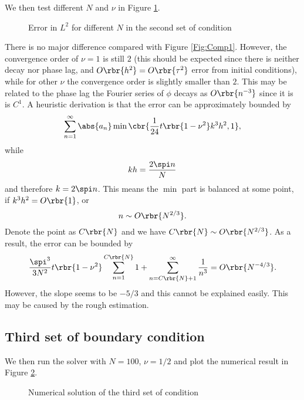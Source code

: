\documentclass[english, nochinese]{pnote}
\begin{document}
We then test different $N$ and $\nu$ in Figure \ref{Fig:Comp2}.

\begin{figure}[htbp]
\centering
\scalebox{0.7}{}
\caption{Error in $L^2$ for different $N$ in the second set of condition}
\label{Fig:Comp2}
\end{figure}

There is no major difference compared with Figure \ref{Fig:Comp1}. However, the convergence order of $ \nu = 1 $ is still $2$ (this should be expected since there is neither decay nor phase lag, and $ O \rbr{h^2} = O \rbr{\tau^2} $ error from initial conditions), while for other $\nu$ the convergence order is slightly smaller than $2$. This may be related to the phase lag the Fourier series of $\phi$ decays as $ O \rbr{n^{-3}} $ since it is is $C^1$. A heuristic derivation is that the error can be approximately bounded by
\begin{equation}
\sum_{ n = 1 }^{\infty} \abs{a_n} \min \cbr{ \frac{1}{24} t \rbr{ 1 - \nu^2 } k^3 h^2, 1 },
\end{equation}
while
\begin{equation}
k h = \frac{ 2 \spi n }{N}
\end{equation}
and therefore $ k = 2 \spi n $. This means the $\min$ part is balanced at some point, if $ k^3 h^2 = O \rbr{1} $, or
\begin{equation}
n \sim O \rbr{N^{ 2 / 3 }}.
\end{equation}
Denote the point as $ C \rbr{N} $ and we have $ C \rbr{N} \sim O \rbr{N^{ 2 / 3 }} $. As a result, the error can be bounded by
\begin{equation}
\frac{\spi^3}{ 3 N^2 } t \rbr{ 1 - \nu^2 } \sum_{ n = 1 }^{ C \rbr{N} } 1 + \sum_{ n = C \rbr{N} + 1 }^{\infty} \frac{1}{n^3} = O \rbr{N^{ -4 / 3 }}.
\end{equation}
However, the slope seems to be $ -5 / 3 $ and this cannot be explained easily. This may be caused by the rough estimation.

\subsection{Third set of boundary condition}

We then run the solver with $ N = 100 $, $ \nu = 1 / 2 $ and plot the numerical result in Figure \ref{Fig:Num3}.

\begin{figure}[htbp]
\centering

\caption{Numerical solution of the third set of condition}
\label{Fig:Num3}
\end{figure}
\end{document}
